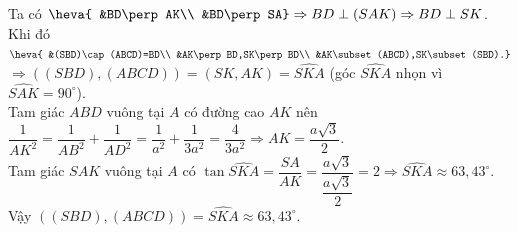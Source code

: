 \begin{ex}
{\begin{itemchoice}
   Ta có $\heva{ 
   &BD\perp AK\\ 
   &BD\perp  SA}
   \Rightarrow BD\perp (SAK)  \Rightarrow BD\perp SK$.\\
    Khi đó $\heva{
   &(SBD)\cap  (ABCD)=BD\\
    &AK\perp BD,SK\perp BD\\
   &AK\subset  (ABCD),SK\subset (SBD).}$\\
   $\Rightarrow ((SBD),(ABCD))=(SK,AK)=\widehat{SKA}$ (góc $\widehat{SKA}$ nhọn vì  $\widehat{SAK}=90^{\circ}$).\\
   Tam giác $ABD$ vuông tại $A$ có đường cao  $AK$ nên\\
   $\dfrac{1}{AK^2}=\dfrac{1}{AB^2}+\dfrac{1}{AD^2}=\dfrac{1}{a^2}+\dfrac{1}{3a^2}=\dfrac{4}{3a^2}\Rightarrow AK=\dfrac{a\sqrt{3}}{2}$.\\ 
   Tam giác $SAK$ vuông  tại $A$ có $\tan\widehat{SKA}=\dfrac{SA}{AK}=\dfrac{a\sqrt 3}{\dfrac{a\sqrt {3}}{2}}=2\Rightarrow\widehat{SKA}\approx63,43^{\circ}$.\\
   Vậy $((SBD),(ABCD))=\widehat{SKA}\approx63,43^{\circ}$. 
  \end{itemchoice}
  }
\end{ex}

